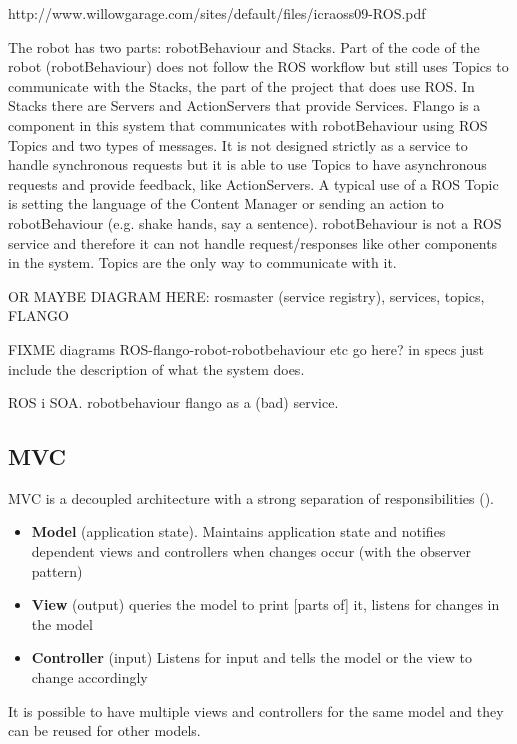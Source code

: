 http://www.willowgarage.com/sites/default/files/icraoss09-ROS.pdf

The robot has two parts: robotBehaviour and Stacks.
Part of the code of the robot (robotBehaviour) does not follow the \ac{ROS} workflow but still uses Topics to communicate with the Stacks, the part of the project that does use \ac{ROS}.
In Stacks there are Servers and ActionServers that provide Services.
Flango is a component in this system that communicates with robotBehaviour using \ac{ROS} Topics and two types of messages.
It is not designed strictly as a service to handle synchronous requests but it is able to use Topics to have asynchronous requests and provide feedback, like ActionServers.
A typical use of a \ac{ROS} Topic is setting the language of the Content Manager or sending an action to robotBehaviour (e.g. shake hands, say a sentence).
robotBehaviour is not a \ac{ROS} service and therefore it can not handle request/responses like other components in the system.
Topics are the only way to communicate with it.

OR MAYBE DIAGRAM HERE: rosmaster (service registry), services, topics, FLANGO

FIXME diagrams ROS-flango-robot-robotbehaviour etc go here? in specs  just include the description of what the system does.

ROS i SOA.
robotbehaviour
flango as a (bad) service.



\subsection{MVC}
\ac{MVC} is a decoupled architecture with a strong separation of responsibilities ().
\begin{itemize}
    \item \textbf{Model} (application state). Maintains application state and notifies dependent views and controllers when changes occur (with the observer pattern)
    \item \textbf{View} (output) queries the model to print [parts of] it, listens for changes in the model
    \item \textbf{Controller} (input) Listens for input and tells the model or the view to change accordingly
\end{itemize}

It is possible to have multiple views and controllers for the same model and they can be reused for other models.

